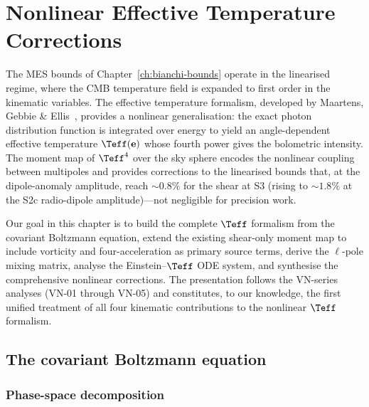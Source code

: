 
\chapter{Nonlinear Effective Temperature Corrections}
\label{ch:teff}

The MES bounds of Chapter~\ref{ch:bianchi-bounds} operate in the
linearised regime, where the CMB temperature field is expanded to
first order in the kinematic variables.  The effective temperature
formalism, developed by Maartens, Gebbie \&
Ellis~\cite{MaartensGE1999}, provides a nonlinear generalisation:
the exact photon distribution function is integrated over energy
to yield an angle-dependent effective temperature $\Teff(\mathbf{e})$
whose fourth power gives the bolometric intensity.  The moment map
of $\Teff^4$ over the sky sphere encodes the nonlinear coupling
between multipoles and provides corrections to the linearised bounds
that, at the dipole-anomaly amplitude, reach $\sim 0.8\%$ for the
shear at S3 (rising to $\sim 1.8\%$ at the S2c radio-dipole
amplitude)---not negligible for precision work.

Our goal in this chapter is to build the complete $\Teff$ formalism
from the covariant Boltzmann equation, extend the existing
shear-only moment map to include vorticity and four-acceleration as
primary source terms, derive the $\ell$-pole mixing matrix, analyse
the Einstein--$\Teff$ ODE system, and synthesise the comprehensive
nonlinear corrections.  The presentation follows the VN-series
analyses (VN-01 through VN-05) and constitutes, to our knowledge,
the first unified treatment of all four kinematic contributions to
the nonlinear $\Teff$ formalism.


\section{The covariant Boltzmann equation}\label{sec:boltzmann-eq}

\subsection{Phase-space decomposition}\label{sec:phase-space}

